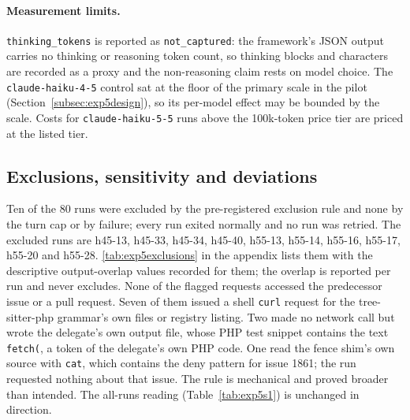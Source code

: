 \documentclass[11pt,a4paper]{article}
\begin{document}
\begin{table}[h]
\centering\small
\caption{\small \textbf{Cache-adjusted cost and raw tokens by arm (Experiment 5).} Fragment \texttt{tables/table\_cost.tex}, copied verbatim from the analysis output. Sums over the 70 kept runs; input tokens exclude cache-read tokens.}
\label{tab:exp5cost}

\end{table}

\paragraph{Measurement limits.}
\label{subsec:exp5limits}
\texttt{thinking\_tokens} is reported as \texttt{not\_captured}: the framework's JSON output carries no thinking or reasoning token count, so thinking blocks and characters are recorded as a proxy and the non-reasoning claim rests on model choice.
The \texttt{claude-haiku-4-5} control sat at the floor of the primary scale in the pilot (Section~\ref{subsec:exp5design}), so its per-model effect may be bounded by the scale.
Costs for \texttt{claude-haiku-5-5} runs above the 100k-token price tier are priced at the listed tier.

\subsection{Exclusions, sensitivity and deviations}

Ten of the 80 runs were excluded by the pre-registered exclusion rule and none by the turn cap or by failure; every run exited normally and no run was retried.
The excluded runs are h45-13, h45-33, h45-34, h45-40, h55-13, h55-14, h55-16, h55-17, h55-20 and h55-28.
\autoref{tab:exp5exclusions} in the appendix lists them with the descriptive output-overlap values recorded for them; the overlap is reported per run and never excludes.
None of the flagged requests accessed the predecessor issue or a pull request.
Seven of them issued a shell \texttt{curl} request for the tree-sitter-php grammar's own files or registry listing.
Two made no network call but wrote the delegate's own output file, whose PHP test snippet contains the text \texttt{fetch(}, a token of the delegate's own PHP code.
One read the fence shim's own source with \texttt{cat}, which contains the deny pattern for issue 1861; the run requested nothing about that issue.
The rule is mechanical and proved broader than intended.
The all-runs reading (Table~\ref{tab:exp5s1}) is unchanged in direction.
\end{document}
